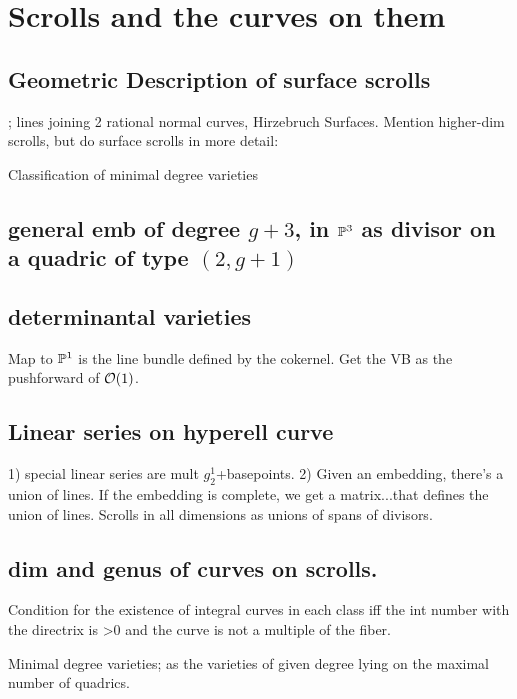 

\chapter{Scrolls and the curves on them}
\label{ScrollsChapter}
\section{ Geometric Description of surface scrolls}; lines joining 2 rational normal curves, Hirzebruch Surfaces. Mention higher-dim scrolls, but do surface scrolls in more detail: 


\begin{fact} 
 Classification of minimal degree varieties
\end{fact}
 
  
\section{ general emb of degree $g+3$, in $\PP^3$ as divisor on a quadric of type $(2,g+1)$}

\section{ determinantal varieties}
  Map to $\PP^1$ is the line bundle defined by the cokernel. Get the VB as the pushforward of $\cO(1)$.

\section{ Linear series on hyperell curve}
 1) special linear series are mult $g^1_2$+basepoints. 2) Given an embedding, there's a union of lines. If the embedding is complete, we get a matrix...that defines the union of lines. Scrolls in all dimensions as unions of spans of divisors.
 

\section{ dim and genus of curves on scrolls.} Condition for the existence of integral curves in each class iff the int number with the directrix is >0 and the curve is not a multiple of the fiber. 

 
 
\begin{fact}
 Minimal degree varieties; as the varieties of given degree lying on the maximal number of quadrics.
\end{fact}

